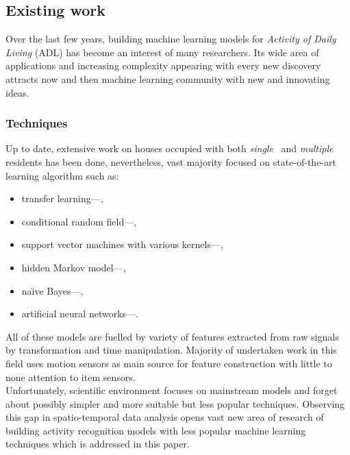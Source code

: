 \documentclass[12pt, a4paper, pdflatex, leqno, twoside, openright]{report}
\begin{document}
    \subsection{Existing work}
Over the last few years, building machine learning models for \emph{Activity of Daily Living} (ADL) has become an interest of many researchers. Its wide area of applications and increasing complexity appearing with every new discovery attracts now and then machine learning community with new and innovating ideas.\\

    \subsubsection{Techniques}
Up to date, extensive work on houses occupied with both \emph{single}~\citep{cook2009assessing,fatima2013unified} and \emph{multiple}~\citep{hsu2010strategies,singla2010recognizing,crandall2009coping} residents has been done, nevertheless, vast majority focused on state-of-the-art learning algorithm such as:
\begin{itemize}
\item transfer learning---\citet{cook2013transfer},
\item conditional random field---\citet{hsu2010strategies,van2010activity},
\item support vector machines with various kernels---\citet{fatima2013unified},
\item hidden Markov model---\citet{rashidi2011discovering},
\item na\"{\i}ve Bayes---\citet{cook2013activity},
\item artificial neural networks---\citet{fatima2013unified,fatima2013analysis}.
\end{itemize}

All of these models are fuelled by variety of features extracted from raw signals by transformation and time manipulation. Majority of undertaken work in this field uses motion sensors as main source for feature construction with little to none attention to item sensors.\\

Unfortunately, scientific environment focuses on mainstream models and forget about possibly simpler and more suitable but less popular techniques. Observing this gap in spatio-temporal data analysis opens vast new area of research of building activity recognition models with less popular machine learning techniques which is addressed in this paper.
\end{document}
